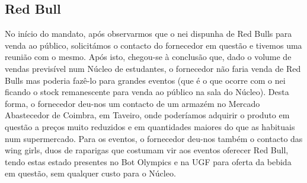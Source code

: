 
\subsection{Red Bull}

No início do mandato, após observarmos que o \acrshort{nei} dispunha de Red Bulls para venda ao público, solicitámos o contacto do fornecedor em questão e tivemos uma reunião com o mesmo. Após isto, chegou-se à conclusão que, dado o volume de vendas previsível num Núcleo de estudantes, o fornecedor não faria venda de Red Bulls mas poderia fazê-lo para grandes eventos (que é o que ocorre com o \acrshort{nei} ficando o stock remanescente para venda ao público na sala do Núcleo). Desta forma, o fornecedor deu-nos um contacto de um armazém no Mercado Abastecedor de Coimbra, em Taveiro, onde poderíamos adquirir o produto em questão a preços muito reduzidos e em quantidades maiores do que as habituais num supermercado. Para os eventos, o fornecedor deu-nos também o contacto das wing girls, duos de raparigas que costumam vir aos eventos oferecer Red Bull, tendo estas estado presentes no Bot Olympics e na UGF para oferta da bebida em questão, sem qualquer custo para o Núcleo.